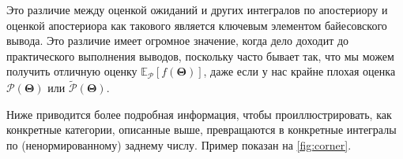 \documentclass[12pt, titlepage]{article}
\newcommand{\meanwrt}[2]{\ensuremath{\mathbb{E}_{{#2}}\left[{#1}\right]}}
\newcommand{\params}{\ensuremath{\boldsymbol\Theta}}
\newcommand{\data}{\ensuremath{\mathbf{D}}}
\newcommand{\posterior}{\ensuremath{\mathcal{P}}}
\begin{document}

Это различие между оценкой ожиданий и других интегралов по апостериору и оценкой апостериора как такового является ключевым элементом байесовского вывода. Это различие имеет огромное значение, когда дело доходит до практического выполнения выводов, поскольку часто бывает так, что мы можем получить отличную оценку $\meanwrt{f(\params)}{\posterior}$, даже если у нас крайне плохая оценка $\posterior(\params)$ или $\tilde{\posterior}(\params)$.

Ниже приводится более подробная информация, чтобы проиллюстрировать, как конкретные категории, описанные выше, превращаются в конкретные интегралы по (ненормированному) заднему числу. Пример показан на {\color{red} \autoref{fig:corner}}.
\end{document}
